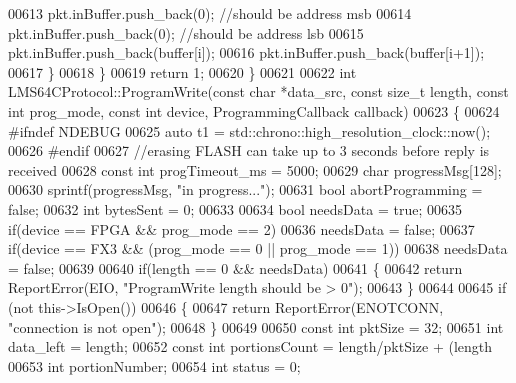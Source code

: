 \begin{DoxyCode}
{{{{{00613             pkt.inBuffer.push\_back(0); \textcolor{comment}{//should be address msb}
00614             pkt.inBuffer.push\_back(0); \textcolor{comment}{//should be address lsb}
00615             pkt.inBuffer.push\_back(buffer[i]);
00616             pkt.inBuffer.push\_back(buffer[i+1]);
00617         \}
00618     \}
00619     \textcolor{keywordflow}{return} 1;
00620 \}
00621 
00622 \textcolor{keywordtype}{int} LMS64CProtocol::ProgramWrite(\textcolor{keyword}{const} \textcolor{keywordtype}{char} *data\_src, \textcolor{keyword}{const} \textcolor{keywordtype}{size\_t} length, \textcolor{keyword}{const} \textcolor{keywordtype}{int} prog\_mode, \textcolor{keyword}{const} \textcolor{keywordtype}{int} 
      device, ProgrammingCallback callback)
00623 \{
00624 \textcolor{preprocessor}{#ifndef NDEBUG}
00625     \textcolor{keyword}{auto} t1 = std::chrono::high\_resolution\_clock::now();
00626 \textcolor{preprocessor}{#endif}
00627     \textcolor{comment}{//erasing FLASH can take up to 3 seconds before reply is received}
00628     \textcolor{keyword}{const} \textcolor{keywordtype}{int} progTimeout\_ms = 5000;
00629     \textcolor{keywordtype}{char} progressMsg[128];
00630     sprintf(progressMsg, \textcolor{stringliteral}{"in progress..."});
00631     \textcolor{keywordtype}{bool} abortProgramming = \textcolor{keyword}{false};
00632     \textcolor{keywordtype}{int} bytesSent = 0;
00633 
00634     \textcolor{keywordtype}{bool} needsData = \textcolor{keyword}{true};
00635     \textcolor{keywordflow}{if}(device == FPGA && prog\_mode == 2)
00636         needsData = \textcolor{keyword}{false};
00637     \textcolor{keywordflow}{if}(device == FX3 && (prog\_mode == 0 || prog\_mode == 1))
00638         needsData = \textcolor{keyword}{false};
00639 
00640     \textcolor{keywordflow}{if}(length == 0 && needsData)
00641     \{
00642         \textcolor{keywordflow}{return} ReportError(EIO, \textcolor{stringliteral}{"ProgramWrite length should be > 0"});
00643     \}
00644 
00645     \textcolor{keywordflow}{if} (not this->IsOpen())
00646     \{
00647         \textcolor{keywordflow}{return} ReportError(ENOTCONN, \textcolor{stringliteral}{"connection is not open"});
00648     \}
00649 
00650     \textcolor{keyword}{const} \textcolor{keywordtype}{int} pktSize = 32;
00651     \textcolor{keywordtype}{int} data\_left = length;
00652     \textcolor{keyword}{const} \textcolor{keywordtype}{int} portionsCount = length/pktSize + (length%
00653     \textcolor{keywordtype}{int} portionNumber;
00654     \textcolor{keywordtype}{int} status = 0;
}}}}}
\end{DoxyCode}
